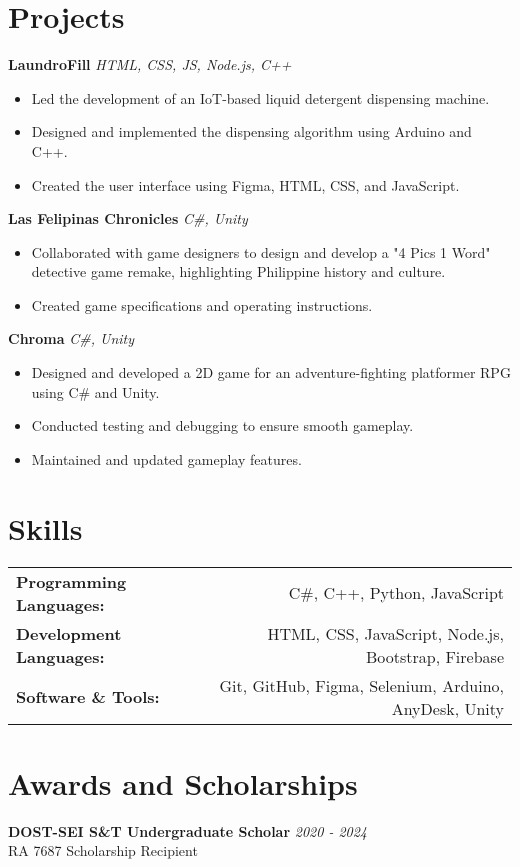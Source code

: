 \documentclass[a4paper, 10pt]{article}
\begin{document}
\section*{Projects}
\noindent \textbf{LaundroFill} \hfill \textit{HTML, CSS, JS, Node.js, C++}
\begin{itemize}[leftmargin=0.5in]
  \item Led the development of an IoT-based liquid detergent dispensing machine.
  \item Designed and implemented the dispensing algorithm using Arduino and C++.
  \item Created the user interface using Figma, HTML, CSS, and JavaScript.
\end{itemize}
\noindent \textbf{Las Felipinas Chronicles} \hfill \textit{C\#, Unity}
\begin{itemize}[leftmargin=0.5in]
  \item Collaborated with game designers to design and develop a "4 Pics 1 Word" detective game remake, highlighting Philippine history and culture.
  \item Created game specifications and operating instructions.
\end{itemize}
\noindent \textbf{Chroma} \hfill \textit{C\#, Unity}
\begin{itemize}[leftmargin=0.5in]
  \item Designed and developed a 2D game for an adventure-fighting platformer RPG using C\# and Unity.
  \item Conducted testing and debugging to ensure smooth gameplay.
  \item Maintained and updated gameplay features.
\end{itemize}

\vspace{-1.5em}

\section*{Skills}
\begin{tabularx}{\textwidth}{@{}X r@{}}
  \textbf{Programming Languages:} & C\#, C++, Python, JavaScript \\
  \textbf{Development Languages:} & HTML, CSS, JavaScript, Node.js, Bootstrap, Firebase \\
  \textbf{Software \& Tools:}     & Git, GitHub, Figma, Selenium, Arduino, AnyDesk, Unity \\
\end{tabularx}

\vspace{-0.75em}

\section*{Awards and Scholarships}
\noindent \textbf{DOST-SEI S\&T Undergraduate Scholar} \hfill \textit{2020 - 2024} \\
RA 7687 Scholarship Recipient
\end{document}
